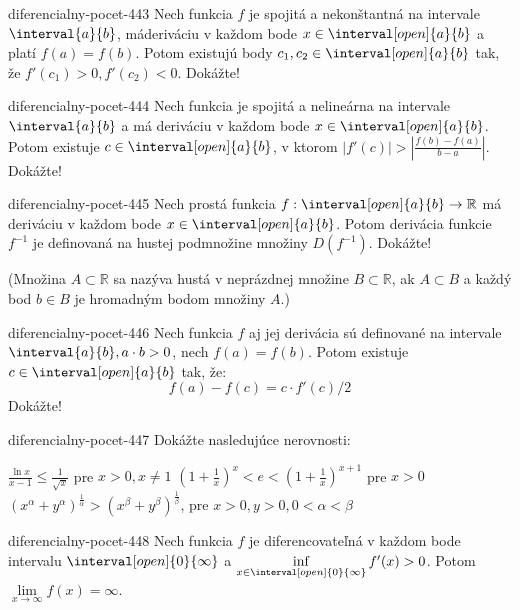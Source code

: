 \begin{defproblem}{diferencialny-pocet-443}
Nech funkcia $f$ je spojitá a nekonštantná na intervale $\interval{a}{b}$,
máderiváciu v každom bode $x \in \interval[open]{a}{b}$ a platí $f(a)=f(b)$.
Potom existujú body $c_1,c_2\in \interval[open]{a}{b}$ tak, že
$f'(c_1)>0,f'(c_2)<0$. Dokážte!
\end{defproblem}

\begin{defproblem}{diferencialny-pocet-444}
Nech funkcia je spojitá a nelineárna na intervale $\interval{a}{b}$ a má
deriváciu v každom bode $x\in \interval[open]{a}{b}$. Potom existuje $c\in
\interval[open]{a}{b}$, v ktorom $|f'(c)|>|\frac{f(b)-f(a)}{b-a}|$. Dokážte!
\end{defproblem}

\begin{defproblem}{diferencialny-pocet-445}
Nech prostá funkcia $f:\interval[open]{a}{b}\rightarrow\mathbb{R}$ má deriváciu
v každom bode $x\in \interval[open]{a}{b}$. Potom derivácia funkcie $f^{-1}$ je
definovaná na hustej podmnožine množiny $D(f^{-1})$. Dokážte!

(Množina $A\subset\mathbb{R}$ sa nazýva hustá v neprázdnej množine
$B\subset\mathbb{R}$, ak $A\subset B$ a každý bod $b\in B$ je hromadným bodom
množiny $A$.)
\end{defproblem}

\begin{defproblem}{diferencialny-pocet-446}
Nech funkcia $f$ aj jej derivácia sú definované na intervale
$\interval{a}{b},a\cdot b>0$, nech $f(a)=f(b)$. Potom existuje $c\in
\interval[open]{a}{b}$ tak, že:
\[
  f(a)-f(c)=c\cdot f'(c)/2
\]
Dokážte!
\end{defproblem}

\begin{defproblem}{diferencialny-pocet-447}
Dokážte nasledujúce nerovnosti:
\begin{tasks}
  \task $\frac{\ln x}{x-1}\leq \frac{1}{\sqrt{x}}$ pre $x>0,x\neq 1$
  \task $(1+\frac{1}{x})^x<e<(1+\frac{1}{x})^{x+1}$ pre $x>0$
  \task
    $(x^{\alpha}+y^{\alpha})^{\frac{1}{\alpha}}>(x^{\beta} +
    y^{\beta})^{\frac{1}{\beta}}$, pre $x>0,y>0,0<\alpha<\beta$
\end{tasks}
\end{defproblem}

\begin{defproblem}{diferencialny-pocet-448}
Nech funkcia $f$ je diferencovateľná v každom bode intervalu
$\interval[open]{0}{\infty}$ a $\inf\limits_{x \in
\interval[open]{0}{\infty}}f'(x)>0$. Potom $\lim\limits_{x \rightarrow \infty}
f(x) = \infty$.
\end{defproblem}

